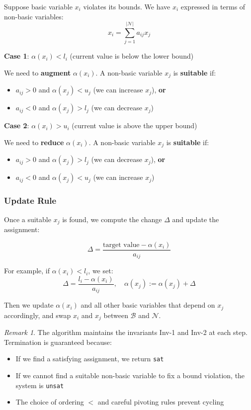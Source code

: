 \documentclass[11pt,a4paper]{article}
\theoremstyle{definition}
\theoremstyle{plain}
\theoremstyle{remark}
\newtheorem*{remark}{Remark}
\begin{document}
Suppose basic variable $x_i$ violates its bounds. We have $x_i$ expressed in terms of non-basic variables:
\[
x_i = \sum_{j=1}^{|\mathcal{N}|} a_{ij} x_j
\]

\textbf{Case 1}: $\alpha(x_i) < l_i$ (current value is below the lower bound)

We need to \textbf{augment} $\alpha(x_i)$. A non-basic variable $x_j$ is \textbf{suitable} if:
\begin{itemize}
    \item $a_{ij} > 0$ and $\alpha(x_j) < u_j$ (we can increase $x_j$), \textbf{or}
    \item $a_{ij} < 0$ and $\alpha(x_j) > l_j$ (we can decrease $x_j$)
\end{itemize}

\textbf{Case 2}: $\alpha(x_i) > u_i$ (current value is above the upper bound)

We need to \textbf{reduce} $\alpha(x_i)$. A non-basic variable $x_j$ is \textbf{suitable} if:
\begin{itemize}
    \item $a_{ij} > 0$ and $\alpha(x_j) > l_j$ (we can decrease $x_j$), \textbf{or}
    \item $a_{ij} < 0$ and $\alpha(x_j) < u_j$ (we can increase $x_j$)
\end{itemize}

\subsubsection{Update Rule}

Once a suitable $x_j$ is found, we compute the change $\Delta$ and update the assignment:

\[
\Delta = \frac{\text{target value} - \alpha(x_i)}{a_{ij}}
\]

For example, if $\alpha(x_i) < l_i$, we set:
\[
\Delta = \frac{l_i - \alpha(x_i)}{a_{ij}}, \quad \alpha(x_j) := \alpha(x_j) + \Delta
\]

Then we update $\alpha(x_i)$ and all other basic variables that depend on $x_j$ accordingly, and swap $x_i$ and $x_j$ between $\mathcal{B}$ and $\mathcal{N}$.

\begin{remark}
The algorithm maintains the invariants Inv-1 and Inv-2 at each step. Termination is guaranteed because:
\begin{itemize}
    \item If we find a satisfying assignment, we return \texttt{sat}
    \item If we cannot find a suitable non-basic variable to fix a bound violation, the system is \texttt{unsat}
    \item The choice of ordering $<$ and careful pivoting rules prevent cycling
\end{itemize}
\end{remark} 
\end{document}
